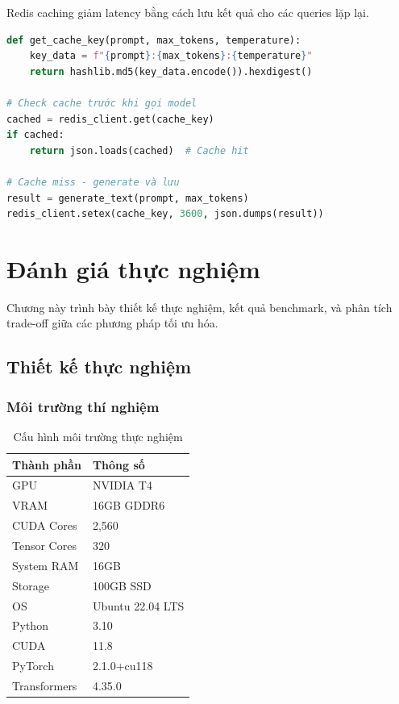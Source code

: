 \documentclass[12pt,a4paper]{report}
\begin{document}
Redis caching giảm latency bằng cách lưu kết quả cho các queries lặp lại.

\begin{lstlisting}[language=Python,caption={Redis caching implementation}]
def get_cache_key(prompt, max_tokens, temperature):
    key_data = f"{prompt}:{max_tokens}:{temperature}"
    return hashlib.md5(key_data.encode()).hexdigest()

# Check cache trước khi gọi model
cached = redis_client.get(cache_key)
if cached:
    return json.loads(cached)  # Cache hit

# Cache miss - generate và lưu
result = generate_text(prompt, max_tokens)
redis_client.setex(cache_key, 3600, json.dumps(result))
\end{lstlisting}

\newpage

\chapter{Đánh giá thực nghiệm}

Chương này trình bày thiết kế thực nghiệm, kết quả benchmark, và phân tích trade-off giữa các phương pháp tối ưu hóa.

\section{Thiết kế thực nghiệm}

\subsection{Môi trường thí nghiệm}

\begin{table}[h]
\centering
\caption{Cấu hình môi trường thực nghiệm}
\label{tab:env-config}
\begin{tabular}{ll}
\toprule
\textbf{Thành phần} & \textbf{Thông số} \\
\midrule
GPU & NVIDIA T4 \\
VRAM & 16GB GDDR6 \\
CUDA Cores & 2,560 \\
Tensor Cores & 320 \\
System RAM & 16GB \\
Storage & 100GB SSD \\
OS & Ubuntu 22.04 LTS \\
Python & 3.10 \\
CUDA & 11.8 \\
PyTorch & 2.1.0+cu118 \\
Transformers & 4.35.0 \\
\bottomrule
\end{tabular}
\end{table}
\end{document}

